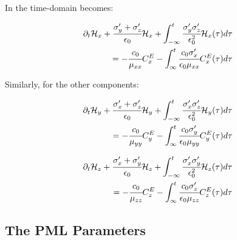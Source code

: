 In the time-domain becomes:

\begin{eqnarray}
    \partial_t\mathcal{H}_x + \cfrac{\sigma_y^{\prime} + \sigma_z^{\prime}}{\epsilon_0}\mathcal{H}_x + \int_{-\infty}^t\cfrac{\sigma_y^{\prime}\sigma_z^{\prime}}{\epsilon_0^2}\mathcal{H}_x(\tau)d\tau \nonumber \\
    = -\cfrac{c_0}{\mu_{xx}}C_x^E - \int_{\infty}^t\cfrac{c_0\sigma_x^{\prime}}{\epsilon_0\mu_{xx}}C_x^E(\tau)d\tau
\end{eqnarray}

Similarly, for the other components:

\begin{eqnarray}
    \partial_t\mathcal{H}_y + \cfrac{\sigma_x^{\prime} + \sigma_z^{\prime}}{\epsilon_0}\mathcal{H}_y + \int_{-\infty}^t\cfrac{\sigma_x^{\prime}\sigma_z^{\prime}}{\epsilon_0^2}\mathcal{H}_y(\tau)d\tau \nonumber \\
    = -\cfrac{c_0}{\mu_{yy}}C_y^E - \int_{\infty}^t\cfrac{c_0\sigma_y^{\prime}}{\epsilon_0\mu_{yy}}C_y^E(\tau)d\tau
\end{eqnarray}

\begin{eqnarray}
    \partial_t\mathcal{H}_z + \cfrac{\sigma_x^{\prime} + \sigma_y^{\prime}}{\epsilon_0}\mathcal{H}_z + \int_{-\infty}^t\cfrac{\sigma_x^{\prime}\sigma_y^{\prime}}{\epsilon_0^2}\mathcal{H}_z(\tau)d\tau \nonumber \\
    = -\cfrac{c_0}{\mu_{zz}}C_z^E - \int_{\infty}^t\cfrac{c_0\sigma_z^{\prime}}{\epsilon_0\mu_{zz}}C_z^E(\tau)d\tau
\end{eqnarray}

\subsection{The PML Parameters}



